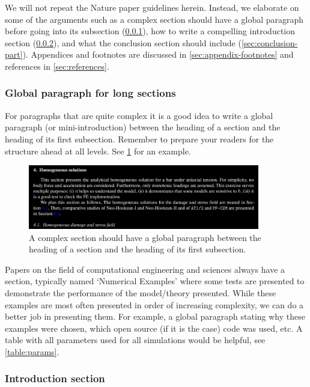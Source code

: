 \documentclass[authoryear,3p,times,preprint,review,fleqn]{elsarticle}
\numberwithin{equation}{section}
\theoremstyle{remark}
\begin{document}
 We will not repeat the Nature paper guidelines herein. Instead, we elaborate on some of the arguments such as a complex section should have a global paragraph before going into its subsection (\cref{sec:global-para}), how to write a compelling introduction section (\cref{sec:introduction-part}), and 
what the conclusion section  should include (\cref{sec:conclusion-part}).  Appendices and footnotes are discussed in \cref{sec:appendix-footnotes} and references in \cref{sec:references}.

\subsubsection{Global paragraph for long sections}\label{sec:global-para}

For paragraphs that are quite complex it is a good idea to write a global paragraph (or mini-introduction) between the heading of a section and the heading of its first subsection. Remember to prepare your readers for the structure ahead at all levels. See \cref{fig:section} for an example. 


\begin{figure}[!h]
  \centering
  \includegraphics[width=0.9\textwidth]{section}
  \caption{A complex section should have a global paragraph between the heading of a section and the heading of its first subsection.}
  \label{fig:section}
\end{figure}


Papers on the field of computational engineering and sciences always have a section, typically named `Numerical Examples' where some tests are presented to demonstrate the performance of the model/theory presented. While these examples are most often presented in order of increasing complexity, we can do a better job in presenting them. For example, a global paragraph stating why these examples were chosen, which open source (if it is the case) code was used, etc. A table with all parameters used for all simulations would be helpful, see  \cref{table:params}.

\subsubsection{Introduction section}\label{sec:introduction-part}
\end{document}
